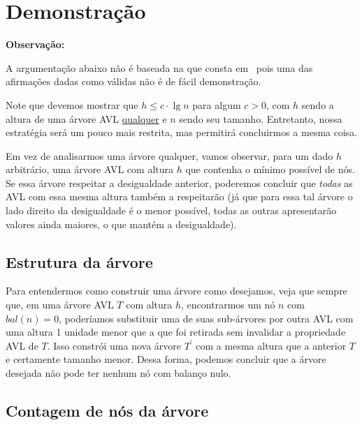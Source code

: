 \documentclass[10pt,a4paper,twoside]{article}
\theoremstyle{definition}
\begin{document}
    \section{Demonstração}

     \begin{framed}
       {\bfseries Observação:}

       A argumentação abaixo não é baseada na que consta em~\textcite{Szwarcfiter2010} pois uma das afirmações dadas como válidas não é de fácil demonstração.
     \end{framed}

     Note que devemos mostrar que \( h \leq c \cdot \lg n \) para algum \( c > 0 \), com \( h \) sendo a altura de uma árvore AVL \ul{qualquer} e \( n \) sendo seu tamanho. Entretanto, nossa estratégia será um pouco mais restrita, mas permitirá concluirmos a mesma coisa.

     Em vez de analisarmos uma árvore qualquer, vamos observar, para um dado \( h \) arbitrário, uma árvore AVL com altura \( h \) que contenha o mínimo possível de nós. Se essa árvore respeitar a desigualdade anterior, poderemos concluir que \emph{todas} as AVL com essa mesma altura também a respeitarão (já que para essa tal árvore o lado direito da desigualdade é o menor possível, todas as outras apresentarão valores ainda maiores, o que mantém a desigualdade).

    \subsection{Estrutura da árvore}

      Para entendermos como construir uma árvore como desejamos, veja que sempre que, em uma árvore AVL \( T \) com altura \( h \), encontrarmos um nó \( n \) com \( bal(n) = 0 \), poderíamos substituir uma de suas sub-árvores por outra AVL com uma altura 1 unidade menor que a que foi retirada sem invalidar a propriedade AVL de \( T \). Isso constrói uma nova árvore \( T^\prime \) com a mesma altura que a anterior \( T \) e certamente tamanho menor. Dessa forma, podemos concluir que a árvore desejada não pode ter nenhum nó com balanço nulo.

    \subsection{Contagem de nós da árvore}
      \label{str:contagem-nos}
\end{document}
